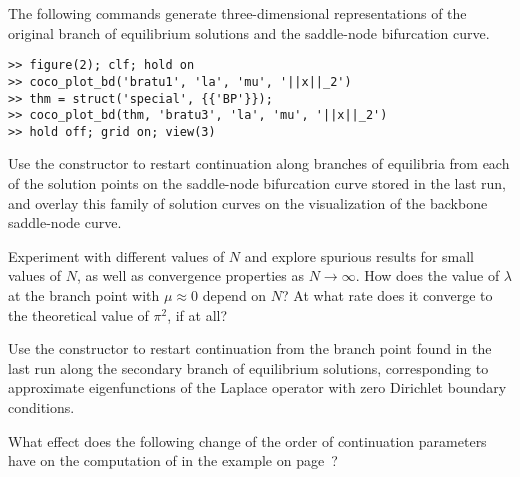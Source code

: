 The following commands generate three-dimensional representations of the original branch of equilibrium solutions and the saddle-node bifurcation curve.
\begin{lstlisting}[language=coco-highlight]
>> figure(2); clf; hold on
>> coco_plot_bd('bratu1', 'la', 'mu', '||x||_2')
>> thm = struct('special', {{'BP'}});
>> coco_plot_bd(thm, 'bratu3', 'la', 'mu', '||x||_2')
>> hold off; grid on; view(3)
\end{lstlisting}
\medskip

\begin{exercises}
\item Use the  constructor to restart continuation along branches of equilibria from each of the solution points on the saddle-node bifurcation curve stored in the last run, and overlay this family of solution curves on the visualization of the backbone saddle-node curve.
\item Experiment with different values of $N$ and explore spurious results for small values of $N$, as well as convergence properties as $N\rightarrow\infty$. How does the value of $\lambda$ at the branch point with $\mu\approx 0$ depend on $N$? At what rate does it converge to the theoretical value of $\pi^2$, if at all?
\item Use the  constructor to restart continuation from the branch point found in the last run along the secondary branch of equilibrium solutions, corresponding to approximate eigenfunctions of the Laplace operator with zero Dirichlet boundary conditions.

\item What effect does the following change of the order of continuation parameters
have on the computation of  in the example on page~\pageref{bratu.bd1}?


\end{exercises}

